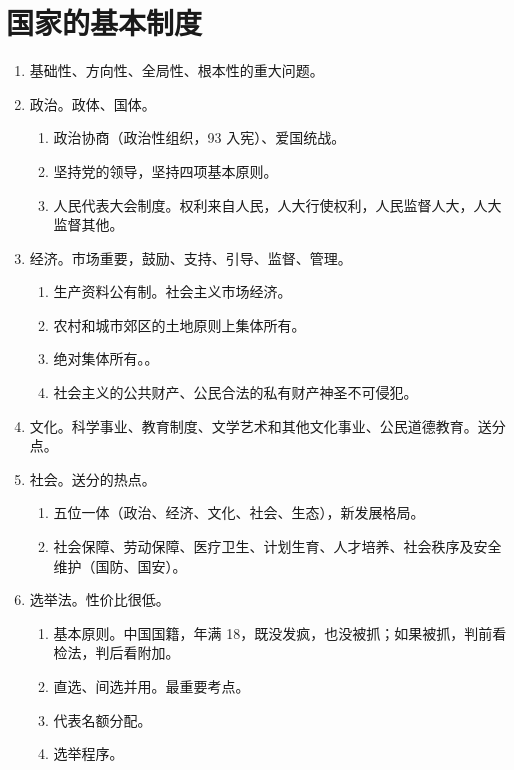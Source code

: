 \section{国家的基本制度}
\begin{enumerate}
  \item 基础性、方向性、全局性、根本性的重大问题。
  \item 政治。政体、国体。
        \begin{enumerate}
          \item 政治协商（政治性组织，93 入宪）、爱国统战。
          \item 坚持党的领导，坚持四项基本原则。
          \item 人民代表大会制度。权利来自人民，人大行使权利，人民监督人大，人大监督其他。
        \end{enumerate}
  \item 经济。市场重要，鼓励、支持、引导、监督、管理。
        \begin{enumerate}
          \item 生产资料公有制。社会主义市场经济。
          \item 农村和城市郊区的土地原则上集体所有。
          \item 绝对集体所有。。
          \item 社会主义的公共财产、公民合法的私有财产神圣不可侵犯。
        \end{enumerate}
  \item 文化。科学事业、教育制度、文学艺术和其他文化事业、公民道德教育。送分点。
  \item 社会。送分的热点。
        \begin{enumerate}
          \item 五位一体（政治、经济、文化、社会、生态），新发展格局。
          \item 社会保障、劳动保障、医疗卫生、计划生育、人才培养、社会秩序及安全维护（国防、国安）。
        \end{enumerate}
  \item 选举法。性价比很低。
        \begin{enumerate}
          \item 基本原则。中国国籍，年满 18，既没发疯，也没被抓；如果被抓，判前看检法，判后看附加。
          \item 直选、间选并用。最重要考点。
          \item 代表名额分配。
          \item 选举程序。
                \begin{enumerate}

\end{enumerate}
\end{enumerate}
\end{enumerate}
